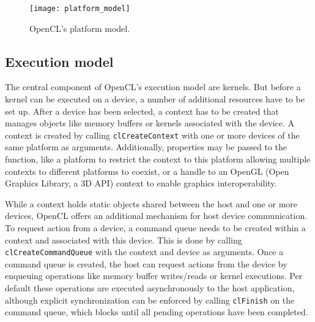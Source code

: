 \begin{figure} 
\centering
\texttt{[image: platform\_model]}
\caption{OpenCL's platform model.}
\label{fig:platform_model}
\end{figure}

\subsection{Execution model}
\label{sec:execution_model}
The central component of OpenCL's execution model are kernels. But before a kernel can be executed on a device, a number of additional resources have to be set up.
After a device has been selected, a context has to be created that manages objects like memory buffers or kernels associated with the device. A context is created by calling \lstinline!clCreateContext! with one or more devices of the same platform as arguments. Additionally, properties may be passed to the function, like a platform to restrict the context to this platform allowing multiple contexts to different platforms to coexist, or a handle to an OpenGL (Open Graphics Library, a 3D API) context to enable graphics interoperability. \cite[p.22]{opencl_book}

While a context holds static objects shared between the host and one or more devices, OpenCL offers an additional mechanism for host device communication. To request action from a device, a command queue needs to be created within a context and associated with this device. This is done by calling \lstinline!clCreateCommandQueue! with the context and device as arguments. Once a command queue is created, the host can request actions from the device by enqueuing operations like memory buffer writes/reads or kernel executions. Per default these operations are executed asynchronously to the host application, although explicit synchronization can be enforced by calling \lstinline!clFinish! on the command queue, which blocks until all pending operations have been completed. \cite[p.22, 23, 26]{opencl_book}

